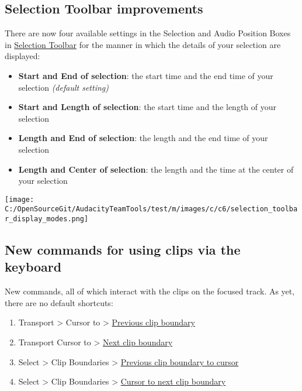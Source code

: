 \begin{multicols}{2}
\subsection{Selection Toolbar improvements}
\label{new:features:in:this:release:selection}There are now four available settings in the Selection and Audio Position Boxes in 
\hyperref[\foo{selection:toolbar:}]{Selection Toolbar}
 for the  manner in which the details of your selection are displayed:

\begin{itemize}
\item \textbf{Start and End of selection}: the start time and the end time of your selection \textit{(default setting)}
\item \textbf{Start and Length of selection}: the start time and the length of your selection
\item \textbf{Length and End of selection}: the length and the end time of your selection
\item \textbf{Length and Center of selection}: the length and the time at the center of your selection
\end{itemize}
\par \protect\texttt{[image: C:/OpenSourceGit/AudacityTeamTools/test/m/images/c/c6/selection\_toolbar\_display\_modes.png]}\par 
\subsection{New commands for using clips via the keyboard}
\label{new:features:in:this:release:clips}New commands, all of which interact with the clips on the focused track. As yet, there are no default shortcuts:

\begin{enumerate}
\item Transport > Cursor to > 
\hyperref[\foo{transport:menu:cursor:to:previous:clip:boundary}]{Previous clip boundary}

\item Transport Cursor to > 
\hyperref[\foo{transport:menu:cursor:to:next:clip:boundary}]{Next clip boundary}

\item Select > Clip Boundaries > 
\hyperref[\foo{select:menu:clip:boundaries:previous:clip:boundary:to:cursor}]{Previous clip boundary to cursor}

\item Select > Clip Boundaries > 
\hyperref[\foo{select:menu:clip:boundaries:cursor:to:next:clip:boundary}]{Cursor to next clip boundary}


\end{enumerate}
\end{multicols}
